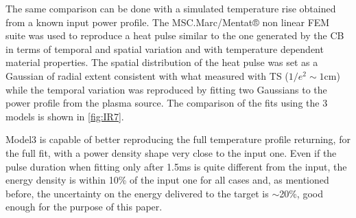 The same comparison can be done with a simulated temperature rise obtained from a known input power profile. The MSC.Marc/Mentat® non linear FEM suite was used to reproduce a heat pulse similar to the one generated by the CB in terms of temporal and spatial variation and with temperature dependent material properties. The spatial distribution of the heat pulse was set as a Gaussian of radial extent consistent with what measured with TS ($1/e^2 \sim 1$cm) while the temporal variation was reproduced by fitting two Gaussians to the power profile from the plasma source. The comparison of the fits using the 3 models is shown in \autoref{fig:IR7}.

Model3 is capable of better reproducing the full temperature profile returning, for the full fit, with a power density shape very close to the input one. Even if the pulse duration when fitting only after 1.5ms is quite different from the input, the energy density is within 10\% of the input one for all cases and, as mentioned before, the uncertainty on the energy delivered to the target is $\sim$20\%, good enough for the purpose of this paper.

